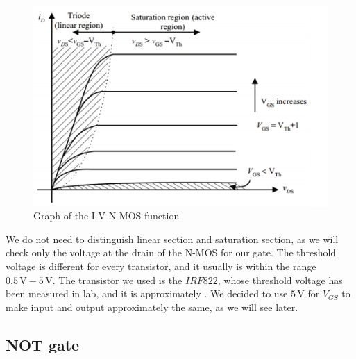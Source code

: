 \documentclass{article}
\begin{document}
\begin{figure}[h]
    \centering
    \includegraphics[scale=.65]{IM_NMOS_Function.png}
    \caption{Graph of the I-V N-MOS function}
    \label{NMOS_Function}
\end{figure}

\vspace{3mm}

We do not need to distinguish linear section and saturation section, as we will check only the voltage at the drain of the N-MOS for our gate. The threshold voltage is different for every transistor, and it usually is within the range $0.5\,\textrm{V} - 5\,\textrm{V}$. The transistor we used is the $IRF822$, whose threshold voltage has been measured in lab, and it is approximately %
. We decided to use $5\,\textrm{V}$ for $V_{GS}$ to make input and output approximately the same, as we will see later.



\subsection{NOT gate}
\end{document}
